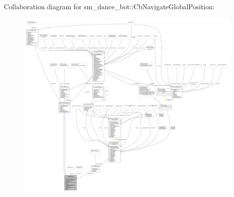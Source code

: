 Collaboration diagram for sm\+\_\+dance\+\_\+bot\+:\+:Cb\+Navigate\+Global\+Position\+:
\nopagebreak
\begin{figure}[H]
\begin{center}
\leavevmode
\includegraphics[width=350pt]{classsm__dance__bot_1_1CbNavigateGlobalPosition__coll__graph}
\end{center}
\end{figure}
